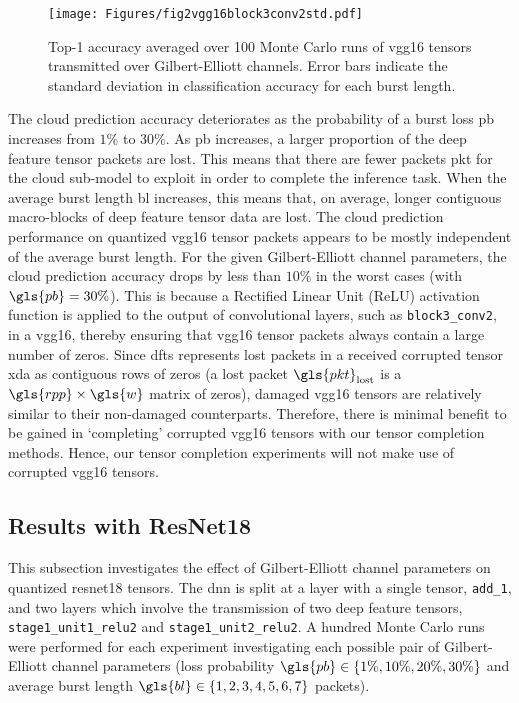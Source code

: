 \begin{figure}[H]
	\centering 
	\texttt{[image: Figures/fig2vgg16block3conv2std.pdf]}
	\caption[Prediction accuracy with VGG16 tensors transmitted over Gilbert-Elliott channels]{Top-1 accuracy averaged over 100 Monte Carlo runs of \gls{vgg16} tensors transmitted over Gilbert-Elliott channels. Error bars indicate the standard deviation in classification accuracy for each burst length.} \label{fig:expts:channel:vgg16}
\end{figure}

The cloud prediction accuracy deteriorates as the probability of a burst loss \gls{pb} increases from $1\%$ to $30\%$. As \gls{pb} increases, a larger proportion of the deep feature tensor packets are lost. This means that there are fewer packets \gls{pkt} for the cloud sub-model to exploit in order to complete the inference task. When the average burst length \gls{bl} increases, this means that, on average, longer contiguous macro-blocks of deep feature tensor data are lost. The cloud prediction performance on quantized \gls{vgg16} tensor packets appears to be mostly independent of the average burst length. For the given Gilbert-Elliott channel parameters, the cloud prediction accuracy drops by less than $10\%$ in the worst cases (with $\gls{pb}=30\%$). This is because a Rectified Linear Unit (ReLU) activation function is applied to the output of convolutional layers, such as \verb|block3_conv2|, in a \gls{vgg16}, thereby ensuring that \gls{vgg16} tensor packets always contain a large number of zeros. Since \gls{dfts} represents lost packets in a received corrupted tensor \gls{xda} as contiguous rows of zeros (a lost packet $\gls{pkt}_\text{lost}$ is a $\gls{rpp} \times \gls{w}$ matrix of zeros), damaged \gls{vgg16}
tensors are relatively similar to their non-damaged counterparts. Therefore, there is minimal benefit to be gained in `completing' corrupted \gls{vgg16} tensors with our tensor completion methods. Hence, our tensor completion experiments will not make use of corrupted \gls{vgg16} tensors.

\subsection{Results with ResNet18} \label{sec:expts:channel:resnet}
This subsection investigates the effect of Gilbert-Elliott channel parameters on quantized \gls{resnet18} tensors. The \gls{dnn} is split at a layer with a single tensor, \verb|add_1|, and two layers which involve the transmission of two deep feature tensors, \verb|stage1_unit1_relu2| and \verb|stage1_unit2_relu2|. A hundred Monte Carlo runs were performed for each experiment investigating each possible pair of Gilbert-Elliott channel parameters (loss probability $\gls{pb} \in \{1\%,10\%,20\%,30\%\}$ and average burst length $\gls{bl} \in \{1,2,3,4,5,6,7\}$ packets).

